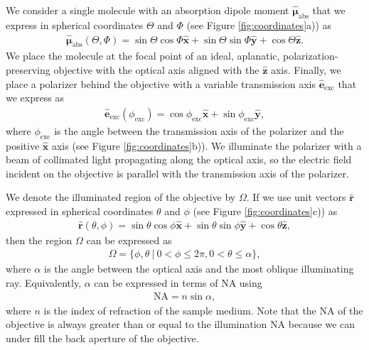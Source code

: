 \documentclass[10pt]{article}
\providecommand{\mb}[1]{\mathbf{#1}}
\providecommand{\mh}[1]{\mathbf{\hat{#1}}}
\providecommand{\bs}[1]{\boldsymbol{#1}}
\begin{document}
We consider a single molecule with an absorption dipole moment
$\hat{\bs{\mu}}_{\text{abs}}$ that we express in spherical coordinates $\Theta$
and $\Phi$ (see Figure \ref{fig:coordinates}a)) as
\begin{align}
  \hat{\bs{\mu}}_{\text{abs}}(\Theta, \Phi) = \sin\Theta\cos\Phi\hat{\mb{x}} + \sin\Theta\sin\Phi\hat{\mb{y}} + \cos\Theta\hat{\mb{z}} \label{eq:mu}.
\end{align}
We place the molecule at the focal point of an ideal, aplanatic,
polarization-preserving objective with the optical axis aligned with the
$\mh{z}$ axis. Finally, we place a polarizer behind the objective with a
variable transmission axis $\hat{\mb{e}}_{\text{exc}}$ that we express as
\begin{align}
 \hat{\mb{e}}_{\text{exc}}(\phi_{\text{exc}}) = \cos\phi_{\text{exc}}\hat{\mb{x}} +
\sin\phi_{\text{exc}}\hat{\mb{y}},\label{eq:excfield}
\end{align}
where $\phi_{\text{exc}}$ is the angle between the transmission axis of the
polarizer and the positive $\mh{x}$ axis (see Figure
\ref{fig:coordinates}b)). We illuminate the polarizer with a beam of collimated
light propagating along the optical axis, so the electric field incident on the
objective is parallel with the transmission axis of the polarizer.

We denote the illuminated region of the objective by $\Omega$. If we use
unit vectors $\hat{\mb{r}}$ expressed in spherical coordinates $\theta$ and
$\phi$ (see Figure \ref{fig:coordinates}c)) as
  \begin{align}
   \hat{\mb{r}}(\theta, \phi) = \sin\theta\cos\phi\hat{\mb{x}} + \sin\theta\sin\phi\hat{\mb{y}} + \cos\theta\hat{\mb{z}}, 
  \end{align}
  then the region $\Omega$ can be expressed as
  \begin{align}
  \Omega = \{\phi, \theta\ |\ 0 < \phi \leq 2\pi, 0 < \theta \leq \alpha\},
  \end{align}
  where $\alpha$ is the angle between the optical axis and the most oblique
  illuminating ray. Equivalently, $\alpha$ can be expressed in terms of NA using
  \begin{align}
    \text{NA} = n\sin\alpha, 
  \end{align}
  where $n$ is the index of refraction of the sample medium. Note that the NA of
  the objective is always greater than or equal to the illumination NA because
  we can under fill the back aperture of the objective.
  
\end{document}
